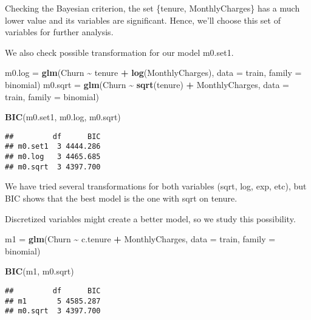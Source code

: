 \documentclass[
]{article}
\newenvironment{Shaded}{\begin{snugshade}}{\end{snugshade}}
\newcommand{\AttributeTok}[1]{\textcolor[rgb]{0.13,0.29,0.53}{#1}}
\newcommand{\FunctionTok}[1]{\textcolor[rgb]{0.13,0.29,0.53}{\textbf{#1}}}
\newcommand{\NormalTok}[1]{#1}
\newcommand{\OtherTok}[1]{\textcolor[rgb]{0.56,0.35,0.01}{#1}}
\newcommand{\SpecialCharTok}[1]{\textcolor[rgb]{0.81,0.36,0.00}{\textbf{#1}}}
\begin{document}
Checking the Bayesian criterion, the set \{tenure, MonthlyCharges\} has
a much lower value and its variables are significant. Hence, we'll
choose this set of variables for further analysis.

We also check possible transformation for our model m0.set1.

\begin{Shaded}
\begin{Highlighting}[]
\NormalTok{m0.log }\OtherTok{=} \FunctionTok{glm}\NormalTok{(Churn }\SpecialCharTok{\textasciitilde{}}\NormalTok{ tenure }\SpecialCharTok{+} \FunctionTok{log}\NormalTok{(MonthlyCharges), }\AttributeTok{data =}\NormalTok{ train,}
    \AttributeTok{family =}\NormalTok{ binomial)}
\NormalTok{m0.sqrt }\OtherTok{=} \FunctionTok{glm}\NormalTok{(Churn }\SpecialCharTok{\textasciitilde{}} \FunctionTok{sqrt}\NormalTok{(tenure) }\SpecialCharTok{+}\NormalTok{ MonthlyCharges, }\AttributeTok{data =}\NormalTok{ train,}
    \AttributeTok{family =}\NormalTok{ binomial)}

\FunctionTok{BIC}\NormalTok{(m0.set1, m0.log, m0.sqrt)}
\end{Highlighting}
\end{Shaded}

\begin{verbatim}
##         df      BIC
## m0.set1  3 4444.286
## m0.log   3 4465.685
## m0.sqrt  3 4397.700
\end{verbatim}

We have tried several transformations for both variables (sqrt, log,
exp, etc), but BIC shows that the best model is the one with sqrt on
tenure.

Discretized variables might create a better model, so we study this
possibility.

\begin{Shaded}
\begin{Highlighting}[]
\NormalTok{m1 }\OtherTok{=} \FunctionTok{glm}\NormalTok{(Churn }\SpecialCharTok{\textasciitilde{}}\NormalTok{ c.tenure }\SpecialCharTok{+}\NormalTok{ MonthlyCharges, }\AttributeTok{data =}\NormalTok{ train, }\AttributeTok{family =}\NormalTok{ binomial)}

\FunctionTok{BIC}\NormalTok{(m1, m0.sqrt)}
\end{Highlighting}
\end{Shaded}

\begin{verbatim}
##         df      BIC
## m1       5 4585.287
## m0.sqrt  3 4397.700
\end{verbatim}
\end{document}
